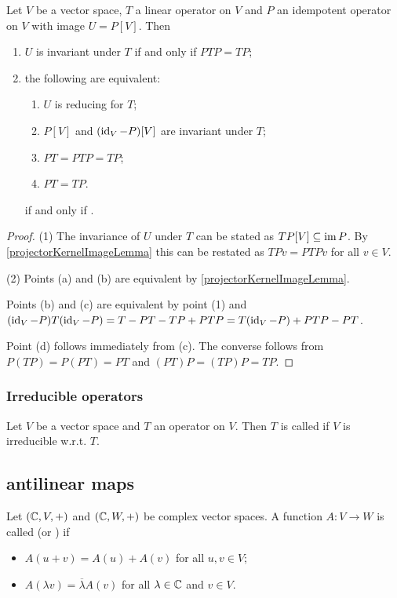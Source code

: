 \begin{lemma}
Let $V$ be a vector space, $T$ a linear operator on $V$ and $P$ an idempotent operator on $V$ with image $U = P[V]$. Then 
\begin{enumerate}
\item $U$ is invariant under $T$ \textup{if and only if} $PTP = TP$;
\item the following are equivalent:
\begin{enumerate}
\item $U$ is reducing for $T$;
\item $P[V]$ and $(\operatorname{id}_V - P)[V]$ are invariant under $T$;
\item $PT = PTP = TP$;
\item $PT = TP$.
\end{enumerate} \textup{if and only if} .
\end{enumerate}
\end{lemma}
\begin{proof}
(1) The invariance of $U$ under $T$ can be stated as $TP[V] \subseteq \operatorname{im} P$. By \ref{projectorKernelImageLemma} this can be restated as $TPv = PTPv$ for all $v\in V$.

(2) Points (a) and (b) are equivalent by \ref{projectorKernelImageLemma}.

Points (b) and (c) are equivalent by point (1) and $(\operatorname{id}_V - P)T(\operatorname{id}_V - P) = T - PT - TP + PTP = T(\operatorname{id}_V - P) + PTP - PT$.

Point (d) follows immediately from (c). The converse follows from $P(TP) = P(PT) = PT$ and $(PT)P = (TP)P = TP$.
\end{proof}

\subsubsection{Irreducible operators}
\begin{definition}
Let $V$ be a vector space and $T$ an operator on $V$. Then $T$ is called  if $V$ is irreducible w.r.t. $T$.
\end{definition}

\subsection{antilinear maps}
\begin{definition}
Let $\sSet{\C, V, +}$ and $\sSet{\C, W, +}$ be complex vector spaces. A function $A: V\to W$ is called  (or ) if
\begin{itemize}
\item $A(u+v) = A(u) + A(v)$ for all $u,v\in V$;
\item $A(\lambda v) = \overline{\lambda}A(v)$ for all $\lambda \in \mathbb{C}$ and $v\in V$.
\end{itemize}
\end{definition}


